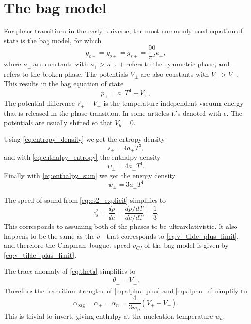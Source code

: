 \section{The bag model}
\label{bag_model}
For phase transitions in the early universe,
the most commonly used equation of state is the bag model, for which
\begin{equation}
g_{e\pm} = g_{p\pm} = g_{s\pm} = \frac{90}{\pi^2} a_\pm,
\end{equation}
where $a_\pm$ are constants with $a_+ > a_-$.
$+$ refers to the symmetric phase, and $-$ refers to the broken phase.
The potentials $V_\pm$ are also constants with $V_+ > V_-$.
This results in the bag equation of state
\cites[eq. 7.33]{lecture_notes}[eq. 8-9]{giese_2020}
\begin{equation}
p_\pm = a_\pm T^4 - V_\pm,
\label{eq:bag_p}
\end{equation}
The potential difference $V_+ - V_-$ is the temperature-independent vacuum energy that is released in the phase transition.
In some articles it's denoted with $\epsilon$.
The potentials are usually shifted so that $V_b = 0$.

Using \eqref{eq:entropy_density} we get the entropy density
\begin{equation}
s_\pm = 4 a_\pm T^3,
\end{equation}
and with \eqref{eq:enthalpy_entropy} the enthalpy density
\begin{equation}
w_\pm = 4 a_\pm T^4.
\end{equation}
Finally with \eqref{eq:enthalpy_sum} we get the energy density
\begin{equation}
w_\pm = 3 a_\pm T^4
\end{equation}

The speed of sound from \eqref{eq:cs2_explicit} simplifies to
\begin{equation}
c_s^2 = \frac{dp}{de} = \frac{dp/dT}{de/dT} = \frac{1}{3}.
\end{equation}
This corresponds to assuming both of the phases to be ultrarelativistic.
It also happens to be the same as the $\tilde{v}_-$ that corresponds to \eqref{eq:v_tilde_plus_limit}, and therefore the Chapman-Jouguet speed $v_{CJ}$ of the bag model is given by \eqref{eq:v_tilde_plus_limit}.

The trace anomaly of \eqref{eq:theta} simplifies to
\begin{align}
\theta_\pm = V_\pm.
\end{align}
Therefore the transition strengths of \eqref{eq:alpha_plus} and \eqref{eq:alpha_n} simplify to
\begin{equation}
\alpha_\text{bag} = \alpha_+ = \alpha_n = \frac{4}{3 w_n} (V_+ - V_-).
\label{eq:alpha_n_bag}
\end{equation}
This is trivial to invert, giving enthalpy at the nucleation temperature $w_n$.

